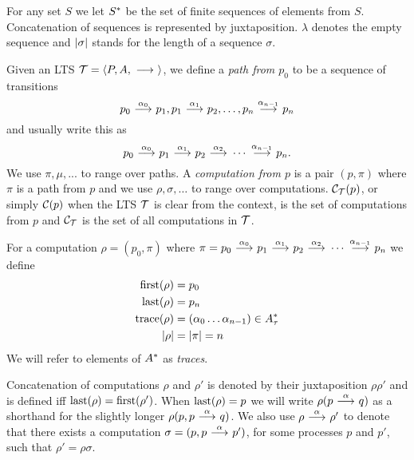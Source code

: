 \begin{definition}
    For any set $S$ we let $S^*$ be the set of finite sequences of elements
    from $S$. Concatenation of sequences is represented by juxtaposition.
    $\lambda$ denotes the empty sequence and $|\sigma|$ stands for the length of a
    sequence $\sigma$.

    Given an LTS $\mathcal{T} = \langle P,A,\ {\stackrel{{}}{\longrightarrow}}\  \rangle$, we define a
    \emph{path from $p_0$} to be a sequence of transitions
    \[
        p_0\ {\stackrel{{\alpha_0}}{\longrightarrow}}\ p_1,
        p_1\ {\stackrel{{\alpha_1}}{\longrightarrow}}\ p_2, \dots ,
        p_n\ {\stackrel{{\alpha_{n-1}}}{\longrightarrow}}\ p_n
    \]
    and usually write this as
    \[
        p_0 \ {\stackrel{{\alpha_0}}{\longrightarrow}}\  p_1
            \ {\stackrel{{\alpha_1}}{\longrightarrow}}\  p_2
            \ {\stackrel{{\alpha_2}}{\longrightarrow}}\  \cdots
            \ {\stackrel{{\alpha_{n-1}}}{\longrightarrow}}\ p_n.
    \]
    We use $\pi,\mu,...$ to range over paths.
    A \emph{computation from $p$} is a pair $(p,\pi)$ where $\pi$ is a path
    from $p$ and
    we use $\rho,\sigma,\dots$ to
    range over computations.
    $\mathcal{C}_{\mathcal{T}}(p)$,
    or simply $\mathcal{C}(p)$ when the LTS $\mathcal{T}$ is clear from the context,
    is the set of computations from $p$ and
    $\mathcal{C}_{\mathcal{T}}$ is the set of all computations in $\mathcal{T}$.

    For a computation $\rho = (p_0,\pi)$
    where $\pi = p_0 \ {\stackrel{{\alpha_0}}{\longrightarrow}}\  p_1 \ {\stackrel{{\alpha_1}}{\longrightarrow}}\  p_2 \ {\stackrel{{\alpha_2}}{\longrightarrow}}\ 
    \cdots \ {\stackrel{{\alpha_{n-1}}}{\longrightarrow}}\ p_n$ we define
    \begin{align*}
        \operatorname{first}(\rho) &= p_0 \\
        \operatorname{last}(\rho) &= p_n \\
        \operatorname{trace}(\rho) &= (\alpha_0\dots\alpha_{n-1}) \in A_\tau^* \\
        |\rho| &= |\pi| = n
    \end{align*}
    We will refer to  elements of $A^*$
    as \emph{traces}. 

    Concatenation of computations $\rho$ and $\rho'$
    is denoted by their juxtaposition
    $\rho\rho'$ and is defined iff $\operatorname{last}(\rho)=\operatorname{first}(\rho')$.
    When $\operatorname{last}(\rho) = p$ we will
    write $\rho(p\ {\stackrel{{\alpha}}{\longrightarrow}}\  q)$ as a shorthand for the slightly longer
    $\rho(p, p\ {\stackrel{{\alpha}}{\longrightarrow}}\  q)$.
    We also use $\rho \ {\stackrel{{\alpha}}{\longrightarrow}}\  \rho'$ to denote that
    there exists a computation
    $\sigma = (p, p \ {\stackrel{{\alpha}}{\longrightarrow}}\  p')$, for some processes $p$ and $p'$,
    such that $\rho' = \rho\sigma$.
\end{definition}

